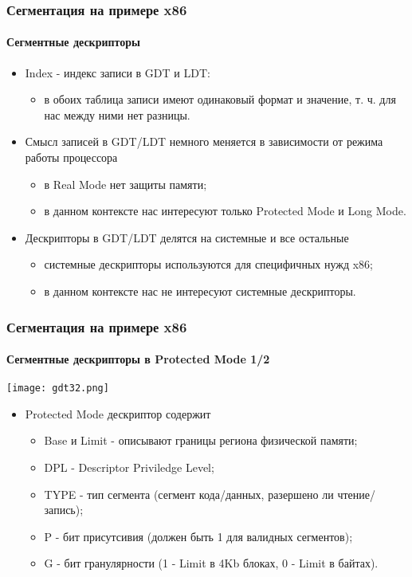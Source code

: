 \begin{frame}
\frametitle{Сегментация на примере x86}
\framesubtitle{Сегментные дескрипторы}
\begin{itemize}
  \item Index - индекс записи в GDT и LDT:
  \begin{itemize}
    \item в обоих таблица записи имеют одинаковый формат и значение, т. ч. для
    нас между ними нет разницы.
  \end{itemize}
  \item Смысл записей в GDT/LDT немного меняется в зависимости от режима работы
  процессора
  \begin{itemize}
    \item в Real Mode нет защиты памяти;
    \item в данном контексте нас интересуют только Protected Mode и Long Mode.
  \end{itemize}
  \item Дескрипторы в GDT/LDT делятся на системные и все остальные
  \begin{itemize}
    \item системные дескрипторы используются для специфичных нужд x86;
    \item в данном контексте нас не интересуют системные дескрипторы.
  \end{itemize}
\end{itemize}
\end{frame}

\begin{frame}
\frametitle{Сегментация на примере x86}
\framesubtitle{Сегментные дескрипторы в Protected Mode 1/2}
\begin{center}
  \texttt{[image: gdt32.png]}
\end{center}
\begin{itemize}
  \item Protected Mode дескриптор содержит
  \begin{itemize}
    \item Base и Limit - описывают границы региона физической памяти;
    \item DPL - Descriptor Priviledge Level;
    \item TYPE - тип сегмента (сегмент кода/данных, разершено ли чтение/запись);
    \item P - бит присутсивия (должен быть 1 для валидных сегментов);
    \item G - бит гранулярности (1 - Limit в 4Kb блоках, 0 - Limit в байтах).
  \end{itemize}
\end{itemize}
\end{frame}

